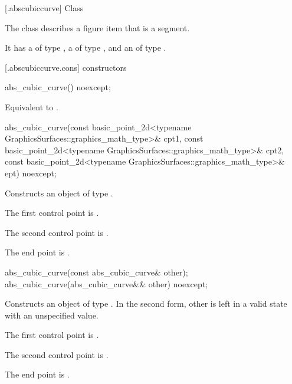  [\iotwod.abscubiccurve] {Class }

\pnum
{}%
The class  describes a figure item that is a segment.

\pnum
It has a  of type , a  of type , and an  of type .

 [\iotwod.abscubiccurve.cons] { constructors}

%
\begin{itemdecl}
abs_cubic_curve() noexcept;
\end{itemdecl}
\begin{itemdescr}
\pnum
\effects
Equivalent to .
\end{itemdescr}

%
\begin{itemdecl}
abs_cubic_curve(const basic_point_2d<typename GraphicsSurfaces::graphics_math_type>& cpt1,
  const basic_point_2d<typename GraphicsSurfaces::graphics_math_type>& cpt2,
  const basic_point_2d<typename GraphicsSurfaces::graphics_math_type>& ept) noexcept;
\end{itemdecl}
\begin{itemdescr}
\pnum
\effects
Constructs an object of type .

\pnum
The first control point is .

\pnum
The second control point is .

\pnum
The end point is .
\end{itemdescr}

%
\begin{itemdecl}
abs_cubic_curve(const abs_cubic_curve& other);
abs_cubic_curve(abs_cubic_curve&& other) noexcept;
\end{itemdecl}
\begin{itemdescr}
\pnum
\effects
Constructs an object of type . In the second form, other is left in a valid state with an unspecified value.

\pnum
The first control point is .

\pnum
The second control point is .

\pnum
The end point is .
\end{itemdescr}


